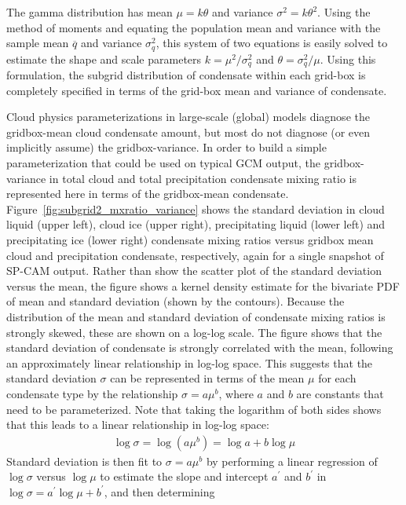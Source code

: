 The gamma distribution has mean \(\mu = k\theta\) and variance
\(\sigma^2 = k \theta^2\). Using the method of moments
\citep[e.g.,][]{wilks_2011} and equating the population mean and
variance with the sample mean \(\overline{q}\) and variance
\(\sigma_q^2\), this system of two equations is easily solved to
estimate the shape and scale parameters \(k = \mu^2 / \sigma_q^2\) and
\(\theta = \sigma_q^2 / \mu\). Using this formulation, the subgrid
distribution of condensate within each grid-box is completely specified
in terms of the grid-box mean and variance of condensate.

Cloud physics parameterizations in large-scale (global) models diagnose
the gridbox-mean cloud condensate amount, but most do not diagnose (or
even implicitly assume) the gridbox-variance. In order to build a simple
parameterization that could be used on typical GCM output, the
gridbox-variance in total cloud and total precipitation condensate
mixing ratio is represented here in terms of the gridbox-mean
condensate. Figure~\ref{fig:subgrid2_mxratio_variance} shows the
standard deviation in cloud liquid (upper left), cloud ice (upper
right), precipitating liquid (lower left) and precipitating ice (lower
right) condensate mixing ratios versus gridbox mean cloud and
precipitation condensate, respectively, again for a single snapshot of
SP-CAM output. Rather than show the scatter plot of the standard
deviation versus the mean, the figure shows a kernel density estimate
for the bivariate PDF of mean and standard deviation (shown by the
contours). Because the distribution of the mean and standard deviation
of condensate mixing ratios is strongly skewed, these are shown on a
log-log scale. The figure shows that the standard deviation of
condensate is strongly correlated with the mean, following an
approximately linear relationship in log-log space. This suggests that
the standard deviation \(\sigma\) can be represented in terms of the
mean \(\mu\) for each condensate type by the relationship
\(\sigma = a \mu^b\), where \(a\) and \(b\) are constants that need to
be parameterized. Note that taking the logarithm of both sides shows
that this leads to a linear relationship in log-log space:
\[\begin{gathered} 
    \log \sigma = \log(a \mu^b) = \log a + b\log \mu
\end{gathered}\] Standard deviation is then fit to \(\sigma = a \mu^b\)
by performing a linear regression of \(\log\sigma\) versus \(\log \mu\)
to estimate the slope and intercept \(a^{\prime}\) and \(b^{\prime}\) in
\(\log \sigma = a^{\prime} \log \mu + b^{\prime}\), and then determining
